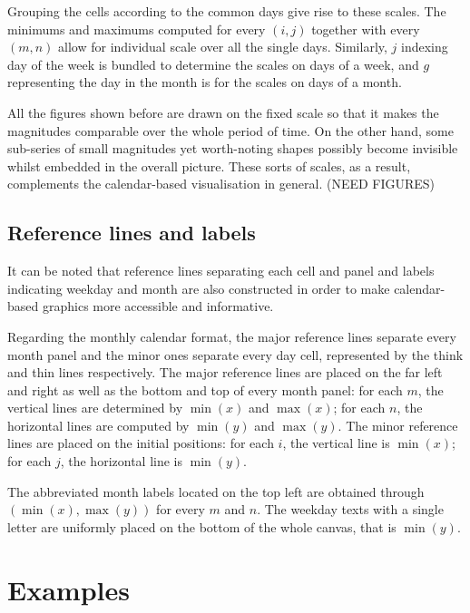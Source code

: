 \documentclass[article]{jss}
\begin{document}
Grouping the cells according to the common days give rise to these
scales. The minimums and maximums computed for every \((i, j)\) together
with every \((m, n)\) allow for individual scale over all the single
days. Similarly, \(j\) indexing day of the week is bundled to determine
the scales on days of a week, and \(g\) representing the day in the
month is for the scales on days of a month.

All the figures shown before are drawn on the fixed scale so that it
makes the magnitudes comparable over the whole period of time. On the
other hand, some sub-series of small magnitudes yet worth-noting shapes
possibly become invisible whilst embedded in the overall picture. These
sorts of scales, as a result, complements the calendar-based
visualisation in general. (NEED FIGURES)

\subsection{Reference lines and
labels}\label{reference-lines-and-labels}

It can be noted that reference lines separating each cell and panel and
labels indicating weekday and month are also constructed in order to
make calendar-based graphics more accessible and informative.

Regarding the monthly calendar format, the major reference lines
separate every month panel and the minor ones separate every day cell,
represented by the think and thin lines respectively. The major
reference lines are placed on the far left and right as well as the
bottom and top of every month panel: for each \(m\), the vertical lines
are determined by \(\min{(x)}\) and \(\max{(x)}\); for each \(n\), the
horizontal lines are computed by \(\min{(y)}\) and \(\max{(y)}\). The
minor reference lines are placed on the initial positions: for each
\(i\), the vertical line is \(\min{(x)}\); for each \(j\), the
horizontal line is \(\min{(y)}\).

The abbreviated month labels located on the top left are obtained
through \((\min{(x)}, \max{(y)})\) for every \(m\) and \(n\). The
weekday texts with a single letter are uniformly placed on the bottom of
the whole canvas, that is \(\min{(y)}\).

\section{Examples}\label{examples}

\label{sec:examples}
\end{document}
